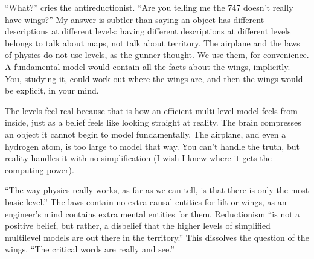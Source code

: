 ``What?'' cries the antireductionist. ``Are you telling me the 747 doesn't really have wings?''  My answer is subtler than saying an object has different descriptions at different levels: having different descriptions at different levels belongs to talk about maps, not talk about territory. The airplane and the laws of physics do not use levels, as the gunner thought. We use them, for convenience. A fundamental model would contain all the facts about the wings, implicitly. You, studying it, could work out where the wings are, and then the wings would be explicit, in your mind.

The levels feel real because that is how an efficient multi-level model feels from inside, just as a belief feels like looking straight at reality. The brain compresses an object it cannot begin to model fundamentally. The airplane, and even a hydrogen atom, is too large to model that way. You can't handle the truth, but reality handles it with no simplification (I wish I knew where it gets the computing power).

``The way physics really works, as far as we can tell, is that there is only the most basic level.'' The laws contain no extra causal entities for lift or wings, as an engineer's mind contains extra mental entities for them. Reductionism ``is not a positive belief, but rather, a disbelief that the higher levels of simplified multilevel models are out there in the territory.''  This dissolves the question of the wings. ``The critical words are really and see.''

